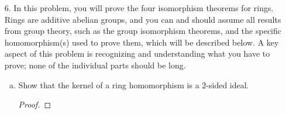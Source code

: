 \begin{itemize}
\begin{enumerate}[(a)]
\begin{proof}
    \end{proof}

    \item Automorphisms of the form $\varphi_g$, as defined in Part (a), are called inner automorphisms. Let $$\text{Inn}(G) = \{ \varphi_g | g \in G \}$$ be the set of inner automorphisms. Show that $\text{Inn}(G)$ is a subgroup of $\text{Aut}(G)$ and that it is normal.
    \begin{proof}

    \end{proof}

    \item Show that the map $G \rar \text{Inn}(G)$ defined by $g \mapsto \varphi_g$ is a homomorphism.
    \begin{proof}

    \end{proof}

    \item Show that $\text{Inn}(G) \cong G/\text{Z}(G)$, where $\text{Z}(G)$ is the center of $G$.
    \begin{proof}

    \end{proof}

    \item Prove that if $G/\text{Z}(G)$ is cyclic, then $G$ is abelian.
    \begin{proof}

    \end{proof}

    \item Show that $\text{Inn}(G)$ cannot be a nontrivial cyclic group.
    \begin{proof}

    \end{proof}
\end{enumerate}





\item[6.] In this problem, you will prove the four isomorphism theorems for rings. Rings
are additive abelian groups, and you can and should assume all results from group
theory, such as the group isomorphism theorems, and the specific homomorphism(s)
used to prove them, which will be described below. A key aspect of this problem
is recognizing and understanding what you have to prove; none of the individual
parts should be long.
\begin{enumerate}[(a)]
    \item Show that the kernel of a ring homomorphism is a $2$-sided ideal.
    \begin{proof}


\end{proof}
\end{enumerate}
\end{itemize}
